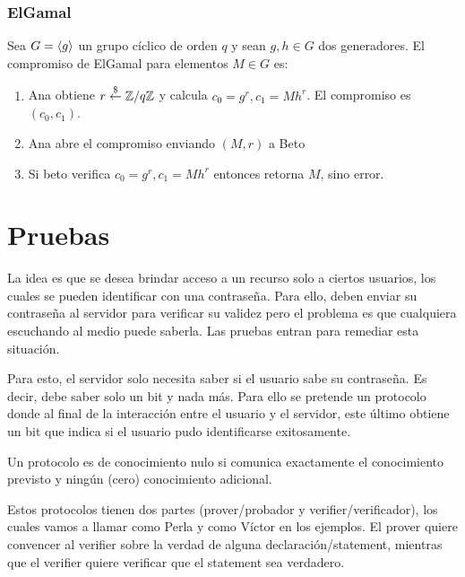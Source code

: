   \subsubsection{ElGamal}
  Sea $G = \left\langle g \right\rangle$ un grupo cíclico de orden $q$ y sean $g,h\in G$ dos generadores.
  El compromiso de ElGamal para elementos $M\in G$ es:
  \begin{enumerate}
    \item Ana obtiene $r \overset{\$}{\leftarrow} \mathbb{Z}/q\mathbb{Z}$ y calcula $c_0 = g^r,c_1 = Mh^r$. El compromiso es $(c_0,c_1)$.
    \item Ana abre el compromiso enviando $(M,r)$ a Beto
    \item Si beto verifica $c_0 = g^r,c_1 = Mh^r$ entonces retorna $M$, sino error.
  \end{enumerate}

  \section{Pruebas}
  La idea es que se desea brindar acceso a un recurso solo a ciertos usuarios, los cuales se
  pueden identificar con una contraseña.
  Para ello, deben enviar su contraseña al servidor para verificar su validez pero el problema 
  es que cualquiera escuchando al medio puede saberla.
  Las pruebas entran para remediar esta situación.

  Para esto, el servidor solo necesita saber si el usuario sabe su contraseña.
  Es decir, debe saber solo un bit y nada más.
  Para ello se pretende un protocolo donde al final de la interacción entre el 
  usuario y el servidor, este último obtiene un bit que indica si el usuario pudo 
  identificarse exitosamente.

  \begin{definition}
    Un protocolo es de conocimiento nulo si comunica exactamente el conocimiento 
    previsto y ningún (cero) conocimiento adicional.
  \end{definition}

  Estos protocolos tienen dos partes (prover/probador y verifier/verificador), los cuales 
  vamos a llamar como Perla y como Víctor en los ejemplos.
  El prover quiere convencer al verifier sobre la verdad de alguna declaración/statement,
  mientras que el verifier quiere verificar que el statement sea verdadero.

